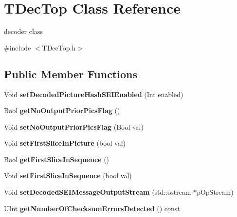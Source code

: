 \hypertarget{class_t_dec_top}{}\section{T\+Dec\+Top Class Reference}
\label{class_t_dec_top}


decoder class  




{\ttfamily \#include $<$T\+Dec\+Top.\+h$>$}

\subsection*{Public Member Functions}
\begin{DoxyCompactItemize}
\item 
\mbox{\label{class_t_dec_top_a2ebbc264b370222cb61c4c8f76619eac}} 
Void {\bfseries set\+Decoded\+Picture\+Hash\+S\+E\+I\+Enabled} (Int enabled)
\item 
\mbox{\label{class_t_dec_top_afc9af9448f6b2af23822b56184778d90}} 
Bool {\bfseries get\+No\+Output\+Prior\+Pics\+Flag} ()
\item 
\mbox{\label{class_t_dec_top_a6d3f4f1d3814dd6ddec60503c4eda615}} 
Void {\bfseries set\+No\+Output\+Prior\+Pics\+Flag} (Bool val)
\item 
\mbox{\label{class_t_dec_top_a97777e2f178163e525bc486b1bd616be}} 
Void {\bfseries set\+First\+Slice\+In\+Picture} (bool val)
\item 
\mbox{\label{class_t_dec_top_a6ae1029b5b7bed12e34bb2c1a97de000}} 
Bool {\bfseries get\+First\+Slice\+In\+Sequence} ()
\item 
\mbox{\label{class_t_dec_top_a52e16ebf7c330422b8a1ef59edd7a4df}} 
Void {\bfseries set\+First\+Slice\+In\+Sequence} (bool val)
\item 
\mbox{\label{class_t_dec_top_a3d2b19ca3e13ba7eec3b7189b5900d26}} 
Void {\bfseries set\+Decoded\+S\+E\+I\+Message\+Output\+Stream} (std\+::ostream $\ast$p\+Op\+Stream)
\item 
\mbox{\label{class_t_dec_top_a99957942a297b36fab610d1e8979bed3}} 
U\+Int {\bfseries get\+Number\+Of\+Checksum\+Errors\+Detected} () const
\end{DoxyCompactItemize}
